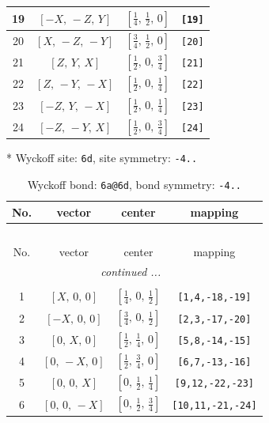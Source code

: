 \documentclass[fleqn,8pt]{jsarticle}
\begin{document}
\begin{longtable}{cccc}
19 & $\left[ - X,\, - Z,\, Y \right]$ & $\left[ \frac{1}{4},\, \frac{1}{2},\, 0 \right]$ & {\tt [19]} \\ \hline
20 & $\left[ X,\, - Z,\, - Y \right]$ & $\left[ \frac{3}{4},\, \frac{1}{2},\, 0 \right]$ & {\tt [20]} \\ \hline
21 & $\left[ Z,\, Y,\, X \right]$ & $\left[ \frac{1}{2},\, 0,\, \frac{3}{4} \right]$ & {\tt [21]} \\ \hline
22 & $\left[ Z,\, - Y,\, - X \right]$ & $\left[ \frac{1}{2},\, 0,\, \frac{1}{4} \right]$ & {\tt [22]} \\ \hline
23 & $\left[ - Z,\, Y,\, - X \right]$ & $\left[ \frac{1}{2},\, 0,\, \frac{1}{4} \right]$ & {\tt [23]} \\ \hline
24 & $\left[ - Z,\, - Y,\, X \right]$ & $\left[ \frac{1}{2},\, 0,\, \frac{3}{4} \right]$ & {\tt [24]} \\
\end{longtable}
* Wyckoff site: {\tt 6d}, site symmetry: {\tt -4..}
\renewcommand{\arraystretch}{1.2}
\begin{longtable}{cccc}
\caption{Wyckoff bond: {\tt 6a@6d}, bond symmetry: {\tt -4..}}
 \\
 \hline \hline
No. & vector & center & mapping \\ \hline \endfirsthead

\multicolumn{3}{l}{\tablename\ \thetable{}} \\
 \hline \hline
No. & vector & center & mapping \\ \hline \endhead

 \hline \hline
\multicolumn{3}{r}{\footnotesize\it continued ...} \\ \endfoot

 \hline \hline
\multicolumn{3}{r}{} \\ \endlastfoot

1 & $\left[ X,\, 0,\, 0 \right]$ & $\left[ \frac{1}{4},\, 0,\, \frac{1}{2} \right]$ & {\tt [1,4,-18,-19]} \\ \hline
2 & $\left[ - X,\, 0,\, 0 \right]$ & $\left[ \frac{3}{4},\, 0,\, \frac{1}{2} \right]$ & {\tt [2,3,-17,-20]} \\ \hline
3 & $\left[ 0,\, X,\, 0 \right]$ & $\left[ \frac{1}{2},\, \frac{1}{4},\, 0 \right]$ & {\tt [5,8,-14,-15]} \\ \hline
4 & $\left[ 0,\, - X,\, 0 \right]$ & $\left[ \frac{1}{2},\, \frac{3}{4},\, 0 \right]$ & {\tt [6,7,-13,-16]} \\ \hline
5 & $\left[ 0,\, 0,\, X \right]$ & $\left[ 0,\, \frac{1}{2},\, \frac{1}{4} \right]$ & {\tt [9,12,-22,-23]} \\ \hline
6 & $\left[ 0,\, 0,\, - X \right]$ & $\left[ 0,\, \frac{1}{2},\, \frac{3}{4} \right]$ & {\tt [10,11,-21,-24]} \\
\end{longtable}
\end{document}
